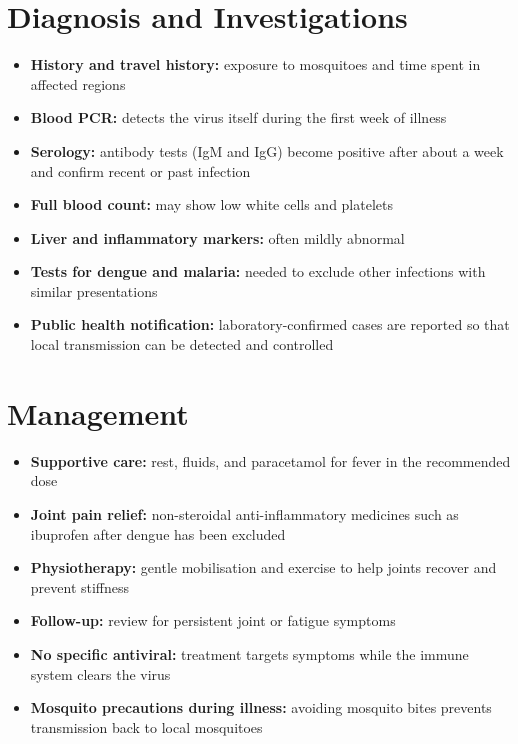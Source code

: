 \section*{Diagnosis and Investigations}
\begin{itemize}
    \item \textbf{History and travel history:} exposure to mosquitoes and time spent in affected regions
    \item \textbf{Blood PCR:} detects the virus itself during the first week of illness
    \item \textbf{Serology:} antibody tests (IgM and IgG) become positive after about a week and confirm recent or past infection
    \item \textbf{Full blood count:} may show low white cells and platelets
    \item \textbf{Liver and inflammatory markers:} often mildly abnormal
    \item \textbf{Tests for dengue and malaria:} needed to exclude other infections with similar presentations
    \item \textbf{Public health notification:} laboratory-confirmed cases are reported so that local transmission can be detected and controlled
\end{itemize}

\section*{Management}
\begin{itemize}
    \item \textbf{Supportive care:} rest, fluids, and paracetamol for fever in the recommended dose
    \item \textbf{Joint pain relief:} non-steroidal anti-inflammatory medicines such as ibuprofen after dengue has been excluded
    \item \textbf{Physiotherapy:} gentle mobilisation and exercise to help joints recover and prevent stiffness
    \item \textbf{Follow-up:} review for persistent joint or fatigue symptoms
    \item \textbf{No specific antiviral:} treatment targets symptoms while the immune system clears the virus
    \item \textbf{Mosquito precautions during illness:} avoiding mosquito bites prevents transmission back to local mosquitoes
\end{itemize}

